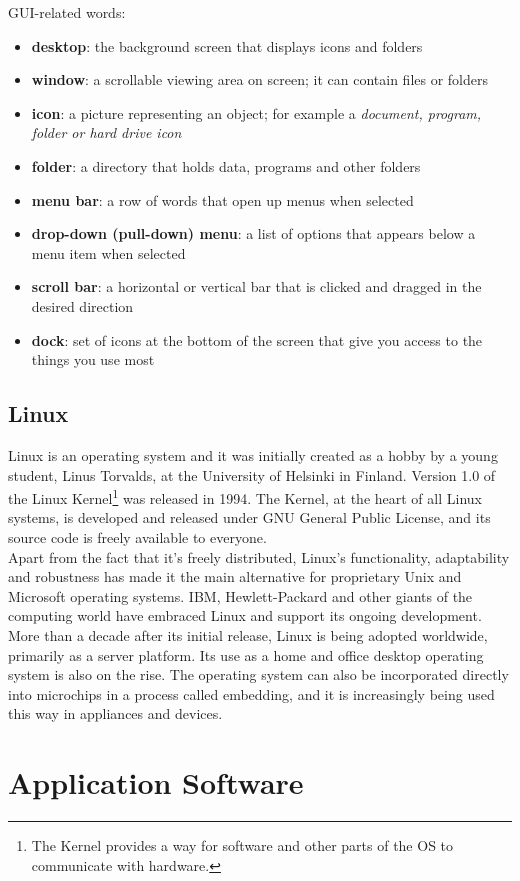 \documentclass[a4paper,8pt]{article}
\begin{document}
GUI-related words:
\begin{itemize}
\item \textbf{desktop}: the background screen that displays icons and folders
\item \textbf{window}: a scrollable viewing area on screen; it can contain
  files or folders
\item \textbf{icon}: a picture representing an object; for example a 
  \textsl{document, program, folder or hard drive icon}
\item \textbf{folder}: a directory that holds data, programs and other folders
\item \textbf{menu bar}: a row of words that open up menus when selected
\item \textbf{drop-down (pull-down) menu}: a list of options that appears
  below a menu item when selected
\item \textbf{scroll bar}: a horizontal or vertical bar that is clicked and
  dragged in the desired direction
\item \textbf{dock}: set of icons at the bottom of the screen that give you
  access to the things you use most
\end{itemize}
\subsection{Linux}
Linux is an operating system and it was initially created as a hobby by a
young student, Linus Torvalds, at the University of Helsinki in Finland.
Version 1.0 of the Linux Kernel\footnote{The Kernel provides a way for 
  software and other parts of the OS to communicate with hardware.} was
released in 1994. The Kernel, at the heart of all Linux systems, is
developed and released under GNU General Public License, and its source
code is freely available to everyone.\\
Apart from the fact that it's freely distributed, Linux's functionality, 
adaptability and robustness has made it the main alternative for proprietary 
Unix and Microsoft operating systems. IBM, Hewlett-Packard and other giants 
of the computing world have embraced Linux and support its ongoing 
development. More than a decade after its initial release, Linux is being 
adopted worldwide, primarily as a server platform. Its use as a home and 
office desktop operating system is also on the rise. The operating system 
can also be incorporated directly into microchips in a process called 
embedding, and it is increasingly being used this way in appliances and
devices.
\section{Application Software}
\end{document}
